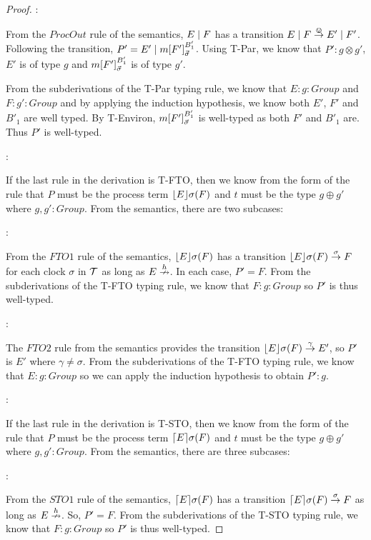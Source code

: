 \begin{proof}
:

\noindent From the $ProcOut$ rule of the semantics, $E \;|\; F$ has a
transition $E \;|\; F \stackrel{\varovee}{\rightarrow} E' \;|\; F'$.  Following the
transition, $P' = E' \;|\; {m}[ F' ]^{B'_1}_{\vec{\sigma}}$.  Using
T-Par, we know that $P' : g \otimes g'$,
$E'$ is of type $g$ and ${m}[ F' ]^{B'_1}_{\vec{\sigma}}$ is of type
$g'$.

From the subderivations of the T-Par typing rule, we know that $E : g
: Group$ and $F : g' : Group$ and by applying the induction
hypothesis, we know both $E'$, $F'$ and $B'_1$ are well typed.  By
T-Environ, ${m}[ F' ]^{B'_1}_{\vec{\sigma}}$ is well-typed as both
$F'$ and $B'_1$ are.  Thus $P'$ is well-typed.

:

\noindent If the last rule in the derivation is T-FTO, then we know
from the form of the rule that $P$ must be the process term
$\lfloor{E}\rfloor {\sigma} ({F})$ and $t$ must be the type $g \oplus g'$ where
$g, g' : Group$.  From the semantics, there are two subcases:

:

\noindent From the $FTO1$ rule of the semantics,
$\lfloor{E}\rfloor {\sigma} ({F})$ has a transition $\lfloor{E}\rfloor {\sigma} ({F})
\stackrel{\sigma}{\rightarrow} F$ for each clock $\sigma$ in $\text{$\mathcal{T}$}$ as long as $E
\stackrel{h}{\nrightarrow}$.  In each case, $P' = F$.  From the subderivations of
the T-FTO typing rule, we know that $F : g : Group$ so $P'$ is thus
well-typed.

:

\noindent The $FTO2$ rule from the semantics provides the transition
$\lfloor{E}\rfloor {\sigma} ({F}) \stackrel{\gamma}{\rightarrow} E'$, so $P'$ is $E'$ where
$\gamma \ne \sigma$.  From the subderivations of the T-FTO typing
rule, we know that $E : g : Group$ so we can apply the induction
hypothesis to obtain $P' : g$.

:

\noindent If the last rule in the derivation is T-STO, then we know
from the form of the rule that $P$ must be the process term
$\lceil{E}\rceil {\sigma} ({F})$ and $t$ must be the type $g \oplus g'$ where
$g, g' : Group$.  From the semantics, there are three subcases:

:

\noindent From the $STO1$ rule of the semantics,
$\lceil{E}\rceil {\sigma} ({F})$ has a transition $\lceil{E}\rceil {\sigma} ({F})
\stackrel{\sigma}{\rightarrow} F$ as long as $E \stackrel{h}{\nrightarrow}$.  So, $P' = F$.  From
the subderivations of the T-STO typing rule, we know that $F : g :
Group$ so $P'$ is thus well-typed.


\end{proof}
